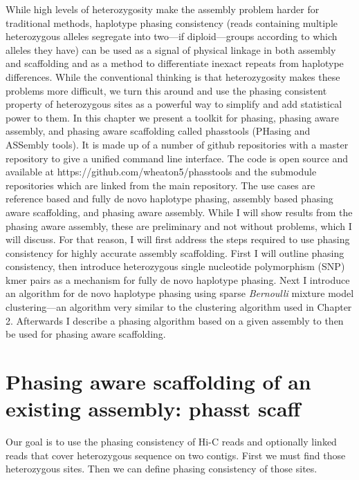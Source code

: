 \par{
While high levels of heterozygosity make the assembly problem harder for traditional methods, haplotype phasing consistency (reads containing multiple heterozygous alleles segregate into two---if diploid---groups according to which alleles they have) can be used as a signal of physical linkage in both assembly and scaffolding and as a method to differentiate inexact repeats from haplotype differences. While the conventional thinking is that heterozygosity makes these problems more difficult, we turn this around and use the phasing consistent property of heterozygous sites as a powerful way to simplify and add statistical power to them. In this chapter we present a toolkit for phasing, phasing aware assembly, and phasing aware scaffolding called phasstools (PHasing and ASSembly tools). It is made up of a number of github repositories with a master repository to give a unified command line interface. The code is open source and available at https://github.com/wheaton5/phasstools and the submodule repositories which are linked from the main repository. The use cases are reference based and fully de novo haplotype phasing, assembly based phasing aware scaffolding, and phasing aware assembly. While I will show results from the phasing aware assembly, these are preliminary and not without problems, which I will discuss. For that reason, I will first address the steps required to use phasing consistency for highly accurate assembly scaffolding. First I will outline phasing consistency, then introduce heterozygous single nucleotide polymorphism (SNP) kmer pairs as a mechanism for fully de novo haplotype phasing. Next I introduce an algorithm for de novo haplotype phasing using sparse \textit{Bernoulli} mixture model clustering---an algorithm very similar to the clustering algorithm used in Chapter 2. Afterwards I describe a phasing algorithm based on a given assembly to then be used for phasing aware scaffolding.
}


\section{Phasing aware scaffolding of an existing assembly: phasst scaff}

\par{
Our goal is to use the phasing consistency of Hi-C reads and optionally linked reads that cover heterozygous sequence on two contigs. First we must find those heterozygous sites. Then we can define phasing consistency of those sites.
}


